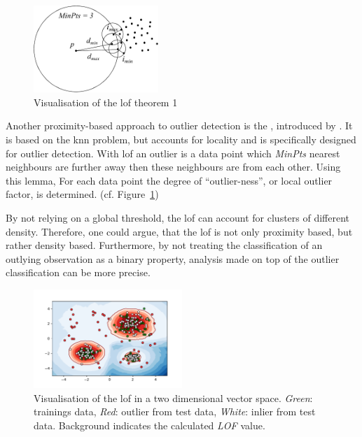 \begin{figure}
	\centering
	\vspace{-10pt}
	\includegraphics[width=0.42\textwidth,keepaspectratio]{figures/200-breuning2000-figure3.pdf}
	\caption[Visualisation of the LOF theorem 1]{Visualisation of the \gls{lof} theorem 1 \parencite[p.~97]{Breunig2000}}
	\label{fig:background:network:novelty:lof-theorem}
\end{figure}

Another proximity-based approach to outlier detection is the , introduced by \textcite{Breunig2000}. It is based on the \gls{knn} problem, but accounts for locality and is specifically designed for outlier detection.
With \gls{lof} an outlier is a data point which \emph{MinPts} nearest neighbours are further away then these neighbours are from each other. 
Using this lemma, For each data point the degree of \enquote{outlier-ness}, or local outlier factor, is determined. (cf. Figure~\ref{fig:background:network:novelty:lof-theorem})

By not relying on a global threshold, the \gls{lof} can account for clusters of different density. Therefore, one could argue, that the \gls{lof} is not only proximity based, but rather density based. Furthermore, by not treating the classification of an outlying observation as a binary property, analysis made on top of the outlier classification can be more precise. \parencite{Breunig2000}

\newpage
\begin{figure}
	\centering
	\includegraphics[width=0.5\textwidth,trim={12mm 5mm 15mm 10mm},keepaspectratio,clip]{figures/200-background-lof.pdf}
	\caption[Example visualisation of the LOF]{Visualisation of the \gls{lof} in a two dimensional vector space. \emph{Green}: trainings data, \emph{Red}: outlier from test data, \emph{White}: inlier from test data. Background indicates the calculated \emph{LOF} value.}
	\label{fig:background:network:novelty:lof}
	\vspace{-25pt}
\end{figure}

